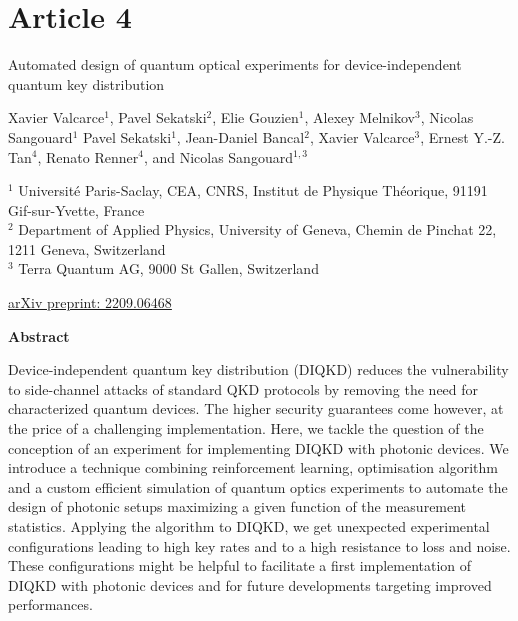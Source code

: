 \chapter*{Article 4}

\centering
\textrm{\LARGE Automated design of quantum optical experiments for device-independent quantum key distribution}

\vspace{2cm}

\normalsize
Xavier Valcarce$^{1}$, Pavel Sekatski$^{2}$, Elie Gouzien$^{1}$, Alexey Melnikov$^{3}$, Nicolas Sangouard$^{1}$
Pavel Sekatski$^{1}$, Jean-Daniel Bancal$^{2}$, Xavier Valcarce$^{3}$, Ernest Y.-Z. Tan$^{4}$, Renato Renner$^{4}$, and Nicolas Sangouard$^{1,3}$
\bigbreak

{\footnotesize
	$^1$ Université Paris-Saclay, CEA, CNRS, Institut de Physique Théorique, 91191 Gif-sur-Yvette, France \\
	$^2$ Department of Applied Physics, University of Geneva, Chemin de Pinchat 22, 1211 Geneva, Switzerland \\
	$^3$ Terra Quantum AG, 9000 St Gallen, Switzerland
}

\raggedright
\bigbreak
\faLink \quad \href{https://arxiv.org/abs/2209.06468}{arXiv preprint: 2209.06468}
\vspace{1cm}

\centering
\textbf{Abstract}
\bigbreak

Device-independent quantum key distribution (DIQKD) reduces the vulnerability to side-channel attacks of standard QKD protocols by removing the need for characterized quantum devices.
The higher security guarantees come however, at the price of a challenging implementation.
Here, we tackle the question of the conception of an experiment for implementing DIQKD with photonic devices.
We introduce a technique combining reinforcement learning, optimisation algorithm and a custom efficient simulation of quantum optics experiments to automate the design of photonic setups maximizing a given function of the measurement statistics.
Applying the algorithm to DIQKD, we get unexpected experimental configurations leading to high key rates and to a high resistance to loss and noise.
These configurations might be helpful to facilitate a first implementation of DIQKD with photonic devices and for future developments targeting improved performances.
